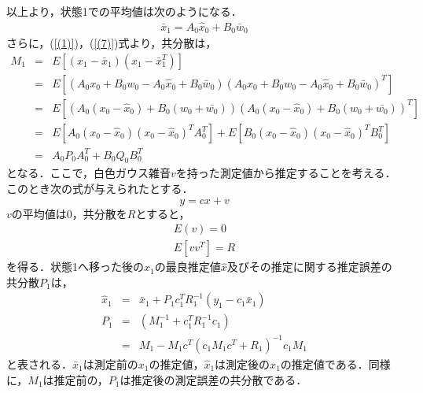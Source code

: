 \documentclass[a4paper,12pt]{jarticle}
\begin{document}
以上より，状態1での平均値は次のようになる．
%
\begin{eqnarray}
 \bar{x}_1 = A_0 \hat{x}_0 + B_0 \bar{w}_0
\label{(7)}
\end{eqnarray}
%
さらに，(\ref{(1)})，(\ref{(7)})式より，共分散は，
%
\begin{eqnarray}
 M_1 & = & E[( x_1 - \bar{x}_1 )(x_1 - \bar{x}_1^T)] \nonumber \\
     & = & E[( A_0 x_0 + B_0 w_0 - A_0 \hat{x}_0 + B_0 \bar{w}_0 )( A_0 x_0 + B_0 w_0 - A_0 \hat{x}_0 + B_0 \bar{w}_0 )^T] \nonumber \\
     & = & E[( A_0( x_0 - \hat{x}_0 ) + B_0(w_0 + \bar{w_0}))( A_0( x_0 - \hat{x}_0 ) + B_0(w_0 + \bar{w_0}))^T] \nonumber \\
     & = & E[A_0( x_0 - \hat{x}_0 )( x_0 - \hat{x}_0 )^T A_0^T] + E[B_0( x_0 - \hat{x}_0 )( x_0 - \hat{x}_0 )^T B_0^T] \nonumber \\
     & = & A_0 P_0 A_0^T + B_0 Q_0 B_0^T
\end{eqnarray}
%
となる．ここで，白色ガウス雑音$ v $を持った測定値から推定することを考える．このとき次の式が与えられたとする．
%
\begin{equation}
 y = cx + v
\end{equation}
%
$ v $の平均値は0，共分散を$ R $とすると，
%
\begin{eqnarray}
 E(v) = 0\\
 E [ vv^T ] = R
\end{eqnarray}
%
を得る．状態1へ移った後の$ x_1 $の最良推定値$ \hat{x} $及びその推定に関する推定誤差の共分散$ P_1 $は，
%
\begin{eqnarray}
 \hat{x}_1 & = & \bar{x}_1 + P_1 c_1^T R_1^{-1}(y_1 - c_1 \bar{x}_1) \\
 P_1 & = & (M_1^{-1} + c_1^T R_1^{-1}c_1) \nonumber \\
     & = & M_1 - M_1c^T( c_1M_1c^T + R_1)^{-1} c_1M_1
\end{eqnarray}
%
と表される．$ \bar{x}_1 $は測定前の$ x_1 $の推定値，$ \hat{x}_1 $は測定後の$ x_1 $の推定値である．同様に，$ M_1 $は推定前の，$ P_1 $は推定後の測定誤差の共分散である．
\end{document}
